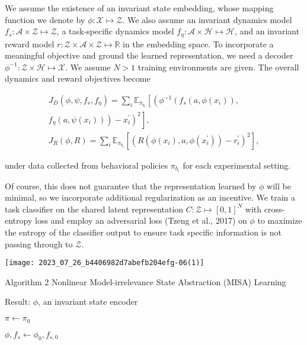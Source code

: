 \documentclass[10pt]{article}
\begin{document}
We assume the existence of an invariant state embedding, whose mapping function we denote by $\phi: \mathcal{X} \mapsto \mathcal{Z}$. We also assume an invariant dynamics model $f_{s}: \mathcal{A} \times \mathcal{Z} \mapsto \mathcal{Z}$, a task-specific dynamics model $f_{\eta}: \mathcal{A} \times \mathcal{H} \mapsto \mathcal{H}$, and an invariant reward model $r: \mathcal{Z} \times \mathcal{A} \times \mathcal{Z} \mapsto \mathbb{R}$ in the embedding space. To incorporate a meaningful objective and ground the learned representation, we need a decoder $\phi^{-1}: \mathcal{Z} \times \mathcal{H} \mapsto \mathcal{X}$. We assume $N>1$ training environments are given. The overall dynamics and reward objectives become

\[
\begin{array}{r}
J_{D}\left(\phi, \psi, f_{s}, f_{\eta}\right)=\sum_{i} \mathbb{E}_{\pi_{b_{i}}}\left[\left(\phi ^ { - 1 } \left(f_{s}\left(a, \phi\left(x_{i}\right)\right),\right.\right.\right. \\
\left.\left.\left.f_{\eta}\left(a, \psi\left(x_{i}\right)\right)\right)-x_{i}^{\prime}\right)^{2}\right], \\
J_{R}(\phi, R)=\sum_{i} \mathbb{E}_{\pi_{b_{i}}}\left[\left(R\left(\phi\left(x_{i}\right), a, \phi\left(x_{i}^{\prime}\right)\right)-r_{i}^{\prime}\right)^{2}\right],
\end{array}
\]

under data collected from behavioral policies $\pi_{b_{i}}$ for each experimental setting.

Of course, this does not guarantee that the representation learned by $\phi$ will be minimal, so we incorporate additional regularization as an incentive. We train a task classifier on the shared latent representation $C: \mathcal{Z} \mapsto[0,1]^{N}$ with cross-entropy loss and employ an adversarial loss (Tzeng et al., 2017) on $\phi$ to maximize the entropy of the classifier output to ensure task specific information is not passing through to $\mathcal{Z}$.

\begin{center}
\texttt{[image: 2023\_07\_26\_b4406982d7abefb204efg-06(1)]}
\end{center}

Algorithm 2 Nonlinear Model-irrelevance State Abstraction (MISA) Learning

Result: $\phi$, an invariant state encoder

$\pi \leftarrow \pi_{0}$

$\phi, f_{s} \leftarrow \phi_{0}, f_{s, 0}$
\end{document}
